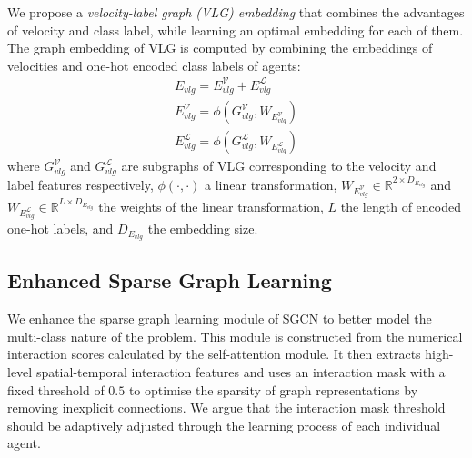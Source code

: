 \documentclass{article}
\begin{document}
We propose a \emph{velocity-label graph (VLG) embedding} that combines the advantages of velocity and class label, while learning an optimal embedding for each of them.
The graph embedding of VLG is computed by combining the embeddings of velocities and one-hot encoded class labels of agents:
\begin{equation} 
    \begin{split}
    E_{vlg} = E_{vlg}^{\mathcal{V}} + E_{vlg}^{\mathcal{L}} \\
    E_{vlg}^{\mathcal{V}} = \phi (G_{vlg}^{\mathcal{V}} , W_{E_{vlg}^{\mathcal{V}}}) \\
    E_{vlg}^{\mathcal{L}} = \phi (G_{vlg}^{\mathcal{L}} , W_{E_{vlg}^{\mathcal{L}}})
    \end{split}
    \label{eq:vlg}
\end{equation}
where $G_{vlg}^{\mathcal{V}}$ and $G_{vlg}^{\mathcal{L}}$ are subgraphs of VLG corresponding to the velocity and label features respectively,
$\phi(\cdot , \cdot)$ a linear transformation, $W_{E_{vlg}^{\mathcal{V}}} \in \mathbb{R}^{2 \times D_{E_{vlg}}}$ and $W_{E_{vlg}^{\mathcal{L}}} \in \mathbb{R}^{L \times D_{E_{vlg}}}$ the weights of the linear transformation, $L$ the length of encoded one-hot labels, and $D_{E_{vlg}}$ the embedding size.

























\subsection{Enhanced Sparse Graph Learning}
\label{sec:aim}
We enhance the sparse graph learning module of SGCN \cite{shi2021sgcn} to better model the multi-class nature of the problem. This module is constructed from the numerical interaction scores calculated by the self-attention module. It then extracts high-level spatial-temporal interaction features and uses an interaction mask with a fixed threshold of $0.5$ to optimise the sparsity of graph representations by removing inexplicit connections. We argue that the interaction mask threshold should be adaptively adjusted through the learning process of each individual agent. 
\end{document}
